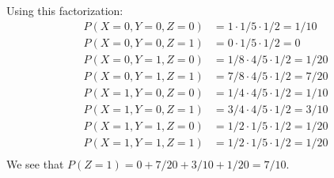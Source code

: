 \documentclass{article}
\begin{document}
Using this factorization:
\begin{align*}
    P(X = 0, Y = 0, Z = 0) & = 1 \cdot 1/5 \cdot 1/2 = 1/10 \\
    P(X = 0, Y = 0, Z = 1) & = 0 \cdot 1/5 \cdot 1/2 = 0 \\
    P(X = 0, Y = 1, Z = 0) & = 1/8 \cdot 4/5 \cdot 1/2 = 1/20 \\
    P(X = 0, Y = 1, Z = 1) & = 7/8 \cdot 4/5 \cdot 1/2 = 7/20 \\
    P(X = 1, Y = 0, Z = 0) & = 1/4 \cdot 4/5 \cdot 1/2 = 1/10 \\
    P(X = 1, Y = 0, Z = 1) & = 3/4 \cdot 4/5 \cdot 1/2 = 3/10 \\
    P(X = 1, Y = 1, Z = 0) & = 1/2 \cdot 1/5 \cdot 1/2 = 1/20 \\
    P(X = 1, Y = 1, Z = 1) & = 1/2 \cdot 1/5 \cdot 1/2 = 1/20 \\
\end{align*}
We see that $P(Z = 1) = 0 + 7/20 + 3/10 + 1/20 = 7/10$.
\end{document}
